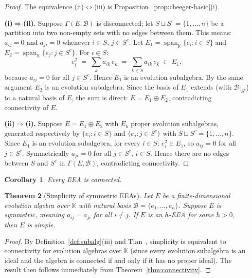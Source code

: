 \documentclass[12pt,a4paper]{amsart}
\newtheorem{theorem}{Theorem}[section]
\newtheorem{corollary}[theorem]{Corollary}
\theoremstyle{definition}
\DeclareMathOperator{\Span}{span}
\newcommand{\K}{\mathbb{K}}
\newcommand{\EA}{E}          %
\newcommand{\natbasis}{\mathcal{B}}  %
\begin{document}
\begin{proof}
The equivalence (ii)$\Leftrightarrow$(iii) is
Proposition~\ref{prop:cheeger-basic}(i).

\medskip
\noindent
\textbf{(i)$\Rightarrow$(ii).}
Suppose $\varGamma(\EA,\natbasis)$ is disconnected; let $S\sqcup
S^c=\{1,\ldots,n\}$ be a partition into two non-empty sets with no
edges between them.  This means: $a_{ij}=0$ and $a_{ji}=0$ whenever
$i\in S$, $j\in S^c$.  Let $\EA_1=\Span_\K\{e_i:i\in S\}$ and
$\EA_2=\Span_\K\{e_j:j\in S^c\}$.  For $i\in S$:
\[
  e_i^2 \;=\; \sum_k a_{ik}\,e_k \;=\; \sum_{k\in S} a_{ik}\,e_k \;\in\; \EA_1,
\]
because $a_{ij}=0$ for all $j\in S^c$.  Hence $\EA_1$ is an evolution
subalgebra.  By the same argument $\EA_2$ is an evolution subalgebra.
Since the basis of $\EA_1$ extends (with $\natbasis|_{S^c}$) to a
natural basis of $\EA$, the sum is direct: $\EA=\EA_1\oplus\EA_2$,
contradicting connectivity of $\EA$.

\medskip
\noindent
\textbf{(ii)$\Rightarrow$(i).}
Suppose $\EA=\EA_1\oplus\EA_2$ with $\EA_k$ proper evolution
subalgebras, generated respectively by $\{e_i:i\in S\}$ and
$\{e_j:j\in S^c\}$ with $S\sqcup S^c=\{1,\ldots,n\}$.  Since $\EA_1$
is an evolution subalgebra, for every $i\in S$:
$e_i^2\in\EA_1$, so $a_{ij}=0$ for all $j\in S^c$.  Symmetrically
$a_{ji}=0$ for all $j\in S^c$, $i\in S$.  Hence there are no edges
between $S$ and $S^c$ in $\varGamma(\EA,\natbasis)$, contradicting
connectivity.
\end{proof}

\begin{corollary}\label{cor:EEA-connected}
Every EEA is connected.
\end{corollary}

\begin{theorem}[Simplicity of symmetric EEAs]\label{thm:simplicity}
Let $\EA$ be a finite-dimensional evolution algebra over $\K$ with
natural basis $\natbasis=\{e_1,\ldots,e_n\}$.  Suppose $\EA$ is
\emph{symmetric}, meaning $a_{ij}=a_{ji}$ for all $i\ne j$.  If $\EA$
is an $h$-EEA for some $h>0$, then $\EA$ is simple.
\end{theorem}

\begin{proof}
By Definition~\ref{def:subalg}(iii) and
Tian~\cite[Corollary~2]{Tian2008}, simplicity is equivalent to
connectivity for evolution algebras over $\K$ (since every evolution
subalgebra is an ideal and the algebra is connected if and only if it
has no proper ideal).  The result then follows immediately from
Theorem~\ref{thm:connectivity}.
\end{proof}
\end{document}
